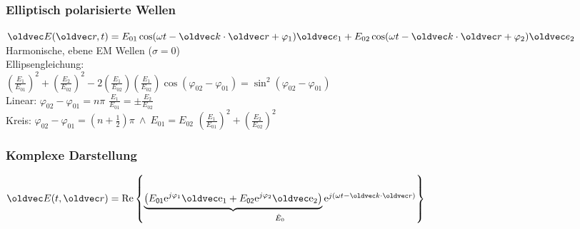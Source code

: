 \documentclass[6pt,a4paper]{scrartcl}
\let\vec\oldvec
\begin{document}
\begin{multicols}{4}
	\subsubsection{Elliptisch polarisierte Wellen}
	$\vec E(\vec r,t) = E_{01} \cos(\omega t -\vec k\cdot\vec r + \varphi_1) \vec e_1 + E_{02} \cos(\omega t - \vec k\cdot\vec r + \varphi_2) \vec e_2$\\
	Harmonische, ebene EM Wellen ($\sigma = 0$)\\

	Ellipsengleichung:\\
	$\left(\frac{E_1}{E_{01}}\right)^2 + \left(\frac{E_2}{E_{02}}\right)^2 - 2\left(\frac{E_1}{E_{02}}\right)\left(\frac{E_1}{E_{02}}\right) \cos(\varphi_{02} - \varphi_{01}) = \sin^2(\varphi_{02} - \varphi_{01})$\\
	Linear: $\varphi_{02} - \varphi_{01} = n\pi$ \qquad $\frac{E_1}{E_{01}} = \pm \frac{E_2}{E_{02}}$\\
	Kreis: $\varphi_{02} - \varphi_{01} = (n+\frac{1}{2}) \pi \ \land \ E_{01} = E_{02}$ \qquad $\left(\frac{E_1}{E_{01}}\right)^2 + \left(\frac{E_2}{E_{02}}\right)^2$\\

	\subsubsection{Komplexe Darstellung}
	$\vec E(t,\vec r) = \Re{\underset{\hat E_0}{\underbrace{\left(E_{\ir 01}\e^{j\varphi_1}\vec\e_1 + E_{\ir 02}\e^{j\varphi_2}\vec\e_2\right)}\e^{j(\omega t-\vec k\cdot\vec r)}}}$\\

\end{multicols}
\end{document}
